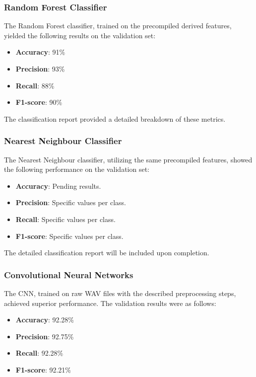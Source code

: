 \subsubsection{Random Forest Classifier}
The Random Forest classifier, trained on the precompiled derived features, yielded the following results on the validation set:
\begin{itemize}
    \item \textbf{Accuracy}: 91\%
    \item \textbf{Precision}: 93\%
    \item \textbf{Recall}: 88\%
    \item \textbf{F1-score}: 90\%
\end{itemize}
The classification report provided a detailed breakdown of these metrics.

\subsubsection{Nearest Neighbour Classifier}
The Nearest Neighbour classifier, utilizing the same precompiled features, showed the following performance on the validation set:
\begin{itemize}
    \item \textbf{Accuracy}: Pending results.
    \item \textbf{Precision}: Specific values per class.
    \item \textbf{Recall}: Specific values per class.
    \item \textbf{F1-score}: Specific values per class.
\end{itemize}
The detailed classification report will be included upon completion.

\subsubsection{Convolutional Neural Networks}
The CNN, trained on raw WAV files with the described preprocessing steps, achieved superior performance. The validation results were as follows:
\begin{itemize}
    \item \textbf{Accuracy}: 92.28\%
    \item \textbf{Precision}: 92.75\%
    \item \textbf{Recall}: 92.28\%
    \item \textbf{F1-score}: 92.21\%
\end{itemize}

